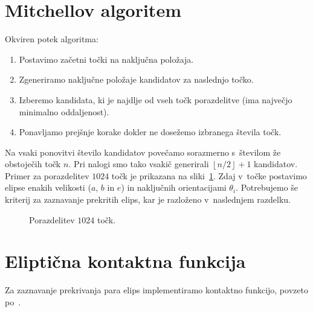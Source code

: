 \section{Mitchellov algoritem}
Okviren potek algoritma:
\begin{enumerate}
    \item Postavimo začetni točki na naključna položaja.
    \item Zgeneriramo naključne položaje kandidatov za naslednjo točko.
    \item Izberemo kandidata, ki je najdlje od vseh točk porazdelitve 
    (ima največjo minimalno oddaljenost).
    \item Ponavljamo prejšnje korake dokler ne dosežemo izbranega števila točk.
\end{enumerate}
Na vsaki ponovitvi število kandidatov povečamo sorazmerno s~številom že 
obstoječih točk $n$. Pri nalogi smo tako vsakič generirali 
$ \left \lfloor{n/2}\right \rfloor + 1$ kandidatov.\\
Primer za porazdelitev $1024$ točk je prikazana na sliki~\ref{fig:porazdelitev_tock}.
Zdaj v~točke postavimo elipse enakih velikosti ($a$, $b$ in $e$) in naključnih
orientacijami $\theta_i$. Potrebujemo še kriterij za zaznavanje prekritih elips,
kar je razloženo v~naslednjem razdelku.
\begin{figure}[!ht]
    \centering
    \resizebox{.7\textwidth}{!}{}
    \caption[Blue noise]{Porazdelitev $1024$ točk.}
    \label{fig:porazdelitev_tock}
\end{figure}

\section{Eliptična kontaktna funkcija}
Za zaznavanje prekrivanja para elips implementiramo kontaktno funkcijo, povzeto
po~\cite{perram1985}.

